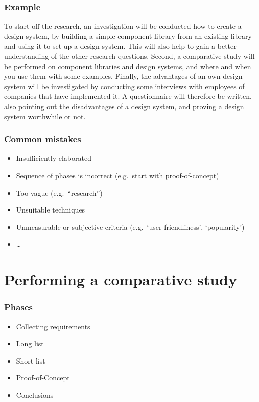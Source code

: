 \documentclass[aspectratio=169]{beamer}
\begin{document}
\begin{frame}
  \frametitle{Example}
  \small
  To start off the research, an investigation will be conducted how to create a design system, by building a simple component library from an existing library and using it to set up a design system. This will also help to gain a better understanding of the other research questions. Second, a comparative study will be performed on component libraries and design systems, and where and when you use them with some examples. Finally, the advantages of an own design system will be investigated by conducting some interviews with employees of companies that have implemented it. A questionnaire will therefore be written, also pointing out the disadvantages of a design system, and proving a design system worthwhile or not.   

\end{frame}

\begin{frame}
  \frametitle{Common mistakes}

  \begin{itemize}
      \item Insufficiently elaborated
      \item Sequence of phases is incorrect (e.g.\ start with proof-of-concept)
      \item Too vague (e.g.\ ``research'')
      \item Unsuitable techniques
      \item Unmeasurable or subjective criteria (e.g.\ `user-friendliness', `popularity')  
      \item \ldots
  \end{itemize}

\end{frame}

\section{Performing a comparative study}

\begin{frame}
  \frametitle{Phases}


  \begin{itemize}
    \item Collecting requirements     
    \item Long list
    \item Short list
    \item Proof-of-Concept
    \item Conclusions
  \end{itemize}

\end{frame}
\end{document}
